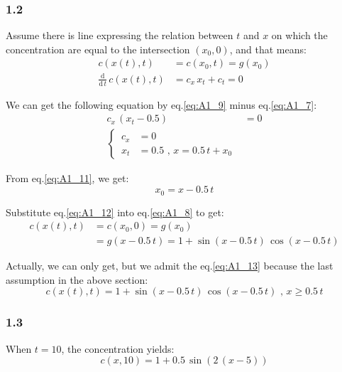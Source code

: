 \documentclass[../main.tex]{subfiles}
\begin{document}
\subsubsection{1.2}

Assume there is line expressing the relation between $t$ and $x$ on which the concentration are equal to the intersection $(x_0,0)$, and that means:
\begin{align}
    c(x(t),t) &= c(x_0,t) = g(x_0) \label{eq:A1_8} \\
    \frac{\mathrm{d}}{\mathrm{d} \, t} \, c(x(t),t) &= c_x \, x_t + c_t = 0 \label{eq:A1_9}
\end{align}

We can get the following equation by eq.\ref{eq:A1_9} minus eq.\ref{eq:A1_7}:
\begin{align}
    c_x \, (x_t - 0.5) &= 0  \label{eq:A1_10} \\
    \begin{cases} \label{eq:A1_11}
        \, c_x &= 0 \\
        \, x_t &= 0.5 \text{ , } x = 0.5 \, t + x_0
    \end{cases}
\end{align}

From eq.\ref{eq:A1_11}, we get:
\begin{equation}
    x_0 = x - 0.5 \, t \label{eq:A1_12}
\end{equation}

Substitute eq.\ref{eq:A1_12} into eq.\ref{eq:A1_8} to get:
\begin{equation}
    \begin{split}
        c(x(t),t) &= c(x_0,0) = g(x_0) \\
        &= g(x - 0.5 \, t) = 1 + \sin{(x - 0.5 \, t)} \, \cos{(x - 0.5 \, t)} \label{eq:A1_13}
    \end{split}
\end{equation}

Actually, we can only get, but we admit the eq.\ref{eq:A1_13} because the last assumption in the above section:
\begin{equation}
    c(x(t),t) = 1 + \sin{(x - 0.5 \, t)} \, \cos{(x - 0.5 \, t)} \text{ , } x \geqslant 0.5 \, t \label{eq:A1_14}
\end{equation}

\subsubsection{1.3}

When $t = 10$, the concentration yields:
\begin{equation}
    c(x,10) = 1 + 0.5 \, \sin{(2 \, (x - 5))} \label{eq:A1_15}
\end{equation}
\end{document}
